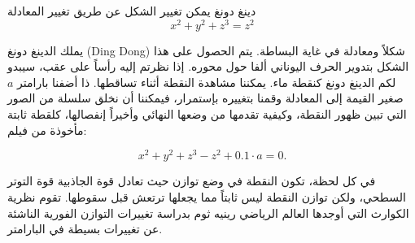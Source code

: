 \begin{surferPage}{دينغ دونغ }
يمكن تغيير الشكل عن طريق تغيير المعادلة\\

\smallskip
\[x^2	+ y^2	+ z^3	= z^2\]

\singlespacing
يملك الدينغ دونغ
\textenglish{(Ding Dong)} شكلاً ومعادلة في غاية البساطة.  يتم الحصول على هذا الشكل بتدوير الحرف اليوناني ألفا حول محوره. إذا نظرتم إليه رأساً على عقب، سيبدو لكم الدينغ دونغ كنقطة ماء. يمكننا مشاهدة النقطة أثناء تساقطها.
\newline
ذا أضفنا بارامتر  $a$  صغير القيمة إلى المعادلة وقمنا بتغييره بإستمرار، فيمكننا أن نخلق سلسلة من الصور التي تبين ظهور النقطة، وكيفية تقدمها من وضعها النهائي وأخيراً إنفصالها، كلقطة ثابتة مأخوذة من فيلم:


\[x^2	+ y^2	+ z^3	-z^2+0.1\cdot a=0.\]

في كل لحظة، تكون النقطة في وضع توازن حيث تعادل قوة الجاذبية قوة التوتر السطحي، ولكن توازن النقطة ليس ثابتاً مما يجعلها ترتعش قبل سقوطها. تقوم نظرية الكوارث التي أوجدها العالم الرياضي رينيه ثوم بدراسة تغييرات التوازن الفورية الناشئة عن تغييرات بسيطة في البارامتر.
\end{surferPage}
